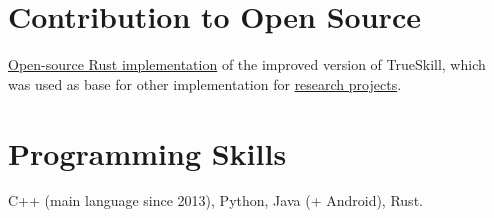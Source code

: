 \documentclass[a4paper, 11pt]{article}
\begin{document}
\section*{Contribution to Open Source}

\href{https://github.com/nikgaevoy/SPbTrueSkill}{Open-source Rust implementation} of the improved version of TrueSkill, which was used as base for other implementation for \href{https://arxiv.org/abs/2101.00400}{research projects}.

\section*{Programming Skills}

C++ (main language since 2013), Python, Java (+ Android), Rust.
\end{document}
